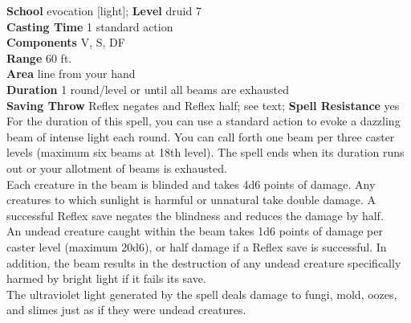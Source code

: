 \textbf{School} evocation [light]; \textbf{Level} druid 7\\
\textbf{Casting Time} 1 standard action\\
\textbf{Components} V, S, DF\\
\textbf{Range} 60 ft.\\
\textbf{Area} line from your hand\\
\textbf{Duration} 1 round/level or until all beams are exhausted\\
\textbf{Saving Throw} Reflex negates and Reflex half; see text; \textbf{Spell Resistance} yes\\
For the duration of this spell, you can use a standard action to evoke a dazzling beam of intense light each round. You can call forth one beam per three caster levels (maximum six beams at 18th level). The spell ends when its duration runs out or your allotment of beams is exhausted.\\
Each creature in the beam is blinded and takes 4d6 points of damage. Any creatures to which sunlight is harmful or unnatural take double damage. A successful Reflex save negates the blindness and reduces the damage by half.\\
An undead creature caught within the beam takes 1d6 points of damage per caster level (maximum 20d6), or half damage if a Reflex save is successful. In addition, the beam results in the destruction of any undead creature specifically harmed by bright light if it fails its save.\\
The ultraviolet light generated by the spell deals damage to fungi, mold, oozes, and slimes just as if they were undead creatures.\\
